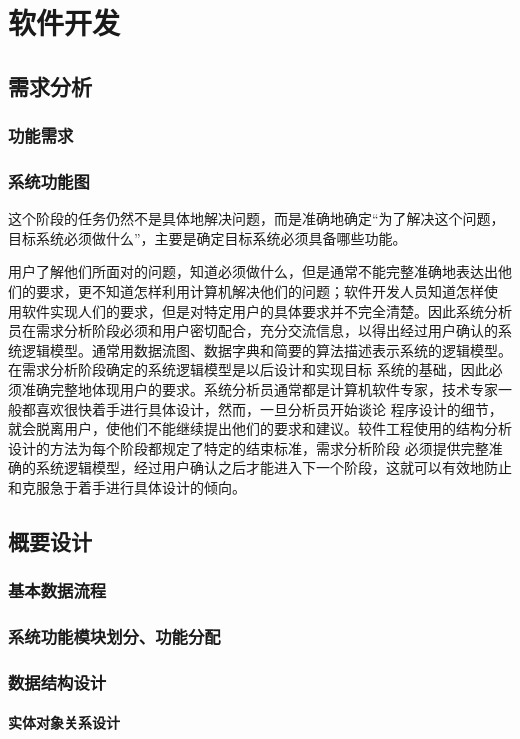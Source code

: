 \chapter{软件开发}
    \section{需求分析}
        \subsection{功能需求}
        \subsection{系统功能图}
        这个阶段的任务仍然不是具体地解决问题，而是准确地确定“为了解决这个问题，目标系统必须做什么”，主要是确定目标系统必须具备哪些功能。
    \par 用户了解他们所面对的问题，知道必须做什么，但是通常不能完整准确地表达出他们的要求，更不知道怎样利用计算机解决他们的问题；软件开发人员知道怎样使 用软件实现人们的要求，但是对特定用户的具体要求并不完全清楚。因此系统分析员在需求分析阶段必须和用户密切配合，充分交流信息，以得出经过用户确认的系 统逻辑模型。通常用数据流图、数据字典和简要的算法描述表示系统的逻辑模型。
    在需求分析阶段确定的系统逻辑模型是以后设计和实现目标 系统的基础，因此必须准确完整地体现用户的要求。系统分析员通常都是计算机软件专家，技术专家一般都喜欢很快着手进行具体设计，然而，一旦分析员开始谈论 程序设计的细节，就会脱离用户，使他们不能继续提出他们的要求和建议。较件工程使用的结构分析设计的方法为每个阶段都规定了特定的结束标准，需求分析阶段 必须提供完整准确的系统逻辑模型，经过用户确认之后才能进入下一个阶段，这就可以有效地防止和克服急于着手进行具体设计的倾向。
    
    \section{概要设计}
        \subsection{基本数据流程}
        \subsection{系统功能模块划分、功能分配}
        \subsection{数据结构设计}
            \subsubsection{实体对象关系设计}
